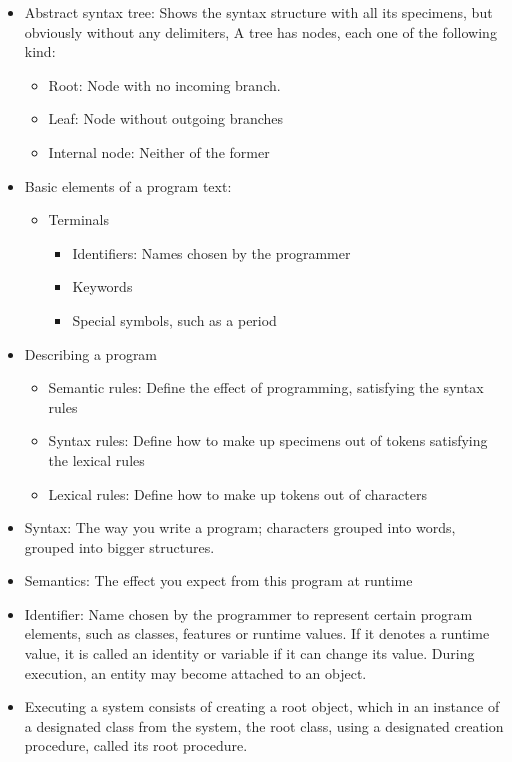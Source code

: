 \documentclass[a4paper]{article}
\begin{document}
\begin{itemize}
\item Abstract syntax tree: Shows the syntax structure with all its specimens, but obviously without any delimiters, A tree has nodes, each one of the following kind:
\begin{itemize}
\item Root: Node with no incoming branch.
\item Leaf: Node without outgoing branches
\item Internal node: Neither of the former
\end{itemize}
\item Basic elements of a program text:
\begin{itemize}
\item Terminals
\begin{itemize}
\item Identifiers: Names chosen by the programmer
\item Keywords
\item Special symbols, such as a period
\end{itemize}
\end{itemize}
\item Describing a program
\begin{itemize}
\item Semantic rules: Define the effect of programming, satisfying the syntax rules
\item Syntax rules: Define how to make up specimens out of tokens satisfying the lexical rules
\item Lexical rules: Define how to make up tokens out of characters
\end{itemize}
\item Syntax: The way you write a program; characters grouped into words, grouped into bigger structures. 
\item Semantics: The effect you expect from this program at runtime
\item Identifier: Name chosen by the programmer to represent certain program elements, such as classes, features or runtime values. If it denotes a runtime value, it is called an identity or variable if it can change its value. During execution, an entity may become attached to an object. 
\item Executing a system consists of creating a root object, which in an instance of a designated class from the system, the root class, using a designated creation procedure, called its root procedure.
\end{itemize}
\end{document}
